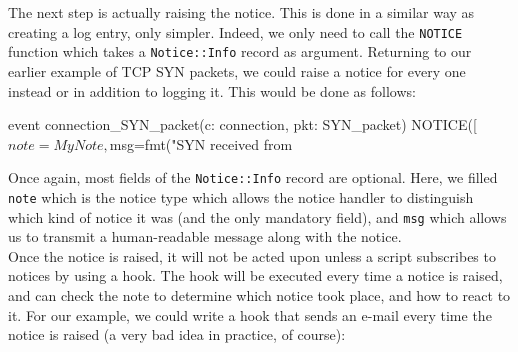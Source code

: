 The next step is actually raising the notice. This is done in a similar way as creating a log entry, only simpler. Indeed, we only need to call the \texttt{NOTICE} function which takes a \texttt{Notice::Info} record as argument. Returning to our earlier example of TCP SYN packets, we could raise a notice for every one instead or in addition to logging it. This would be done as follows:

\begin{code}
event connection_SYN_packet(c: connection, pkt: SYN_packet) {
		NOTICE([$note=MyNote,
                $msg=fmt("SYN received from %
}
\end{code}

Once again, most fields of the \texttt{Notice::Info} record are optional. Here, we filled \texttt{note} which is the notice type which allows the notice handler to distinguish which kind of notice it was (and the only mandatory field), and \texttt{msg} which allows us to transmit a human-readable message along with the notice.\\

Once the notice is raised, it will not be acted upon unless a script subscribes to notices by using a hook. The hook will be executed every time a notice is raised, and can check the note to determine which notice took place, and how to react to it. For our example, we could write a hook that sends an e-mail every time the notice is raised (a very bad idea in practice, of course): \\


